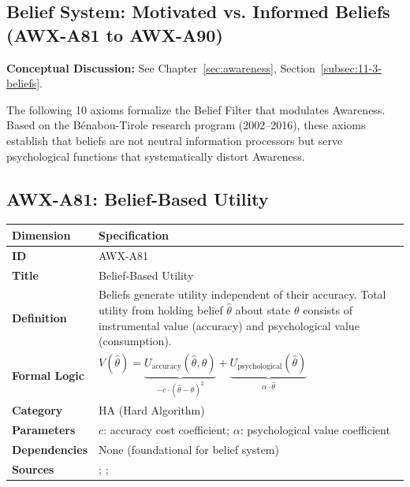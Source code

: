 


\subsection{Belief System: Motivated vs. Informed Beliefs (AWX-A81 to AWX-A90)}

\begin{cross-reference}
\textbf{Conceptual Discussion:} See Chapter~\ref{sec:awareness}, Section~\ref{subsec:11-3-beliefs}.
\end{cross-reference}
The following 10 axioms formalize the Belief Filter that modulates Awareness. Based on the Bénabou-Tirole research program (2002--2016), these axioms establish that beliefs are not neutral information processors but serve psychological functions that systematically distort Awareness.


\subsection{AWX-A81: Belief-Based Utility}

\begin{table}[htbp]
\small
\begin{tabular}{p{3cm}p{11cm}}
\toprule
\textbf{Dimension} & \textbf{Specification} \\
\midrule
\textbf{ID} & AWX-A81 \\
\textbf{Title} & Belief-Based Utility \\
\textbf{Definition} & Beliefs generate utility independent of their accuracy. Total utility from holding belief $\hat{\theta}$ about state $\theta$ consists of instrumental value (accuracy) and psychological value (consumption). \\
\textbf{Formal Logic} & $V(\hat{\theta}) = \underbrace{U_{\text{accuracy}}(\hat{\theta}, \theta)}_{-c \cdot (\hat{\theta} - \theta)^2} + \underbrace{U_{\text{psychological}}(\hat{\theta})}_{\alpha \cdot \hat{\theta}}$ \\
\textbf{Category} & HA (Hard Algorithm) \\
\textbf{Parameters} & $c$: accuracy cost coefficient; $\alpha$: psychological value coefficient \\
\textbf{Dependencies} & None (foundational for belief system) \\
\textbf{Sources} & \citet{benabou2016mindful}; \citet{benabou2011identity}; \citet{brunnermeier2005optimal} \\
\bottomrule
\end{tabular}
\end{table}

